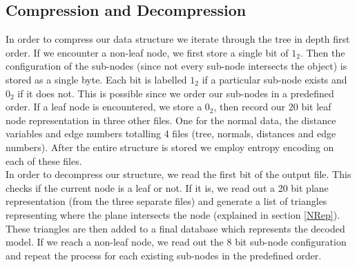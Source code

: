 \subsection{Compression and Decompression}

In order to compress our data structure we iterate through the tree in depth first order. If we encounter a non-leaf node, we first store a single bit of $1_2$. Then the configuration of the sub-nodes (since not every sub-node intersects the object) is stored as a single byte. Each bit is labelled $1_2$ if a particular sub-node exists and $0_2$ if it does not. This is possible since we order our sub-nodes in a predefined order. If a leaf node is encountered, we store a $0_2$, then record our 20 bit leaf node representation in three other files. One for the normal data, the distance variables and edge numbers totalling 4 files (tree, normals, distances and edge numbers). After the entire structure is stored we employ entropy encoding on each of these files. \\

In order to decompress our structure, we read the first bit of the output file. This checks if the current node is a leaf or not. If it is, we read out a 20 bit plane representation (from the three separate files) and generate a list of triangles representing where the plane intersects the node (explained in section \ref{NRep}). These triangles are then added to a final database which represents the decoded model. If we reach a non-leaf node, we read out the 8 bit sub-node configuration and repeat the process for each existing sub-nodes in the predefined order. \\  

